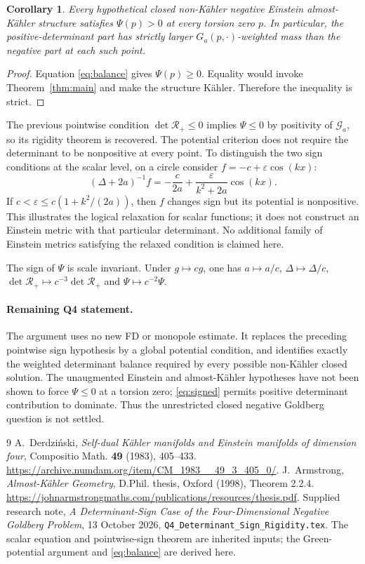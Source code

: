 \documentclass[11pt]{article}
\newtheorem{corollary}[theorem]{Corollary}
\theoremstyle{remark}\newtheorem{remark}[theorem]{Remark}
\newcommand{\RR}{\mathcal R_+}
\begin{document}
\begin{corollary}
Every hypothetical closed non-K\"ahler negative Einstein almost-K\"ahler
structure satisfies $\Psi(p)>0$ at every torsion zero $p$.
In particular, the positive-determinant part has strictly larger
$G_a(p,\cdot)$-weighted mass than the negative part at each such point.
\end{corollary}
\begin{proof}
Equation \eqref{eq:balance} gives $\Psi(p)\ge0$.
Equality would invoke Theorem~\ref{thm:main} and make the structure
K\"ahler. Therefore the inequality is strict.
\end{proof}

The previous pointwise condition $\det\RR\le0$ implies $\Psi\le0$
by positivity of $\mathcal G_a$, so its rigidity theorem is recovered.
The potential criterion does not require the determinant to be
nonpositive at every point. To distinguish the two sign conditions
at the scalar level, on a circle consider $f=-c+\varepsilon\cos(kx)$:
\[
 (\Delta+2a)^{-1}f=-\frac c{2a}
                       +\frac{\varepsilon}{k^2+2a}\cos(kx).
\]
If $c<\varepsilon\le c(1+k^2/(2a))$, then $f$ changes sign but its
potential is nonpositive. This illustrates the logical relaxation for
scalar functions; it does not construct an Einstein metric with that
particular determinant. No additional family of Einstein metrics
satisfying the relaxed condition is claimed here.

The sign of $\Psi$ is scale invariant. Under $g\mapsto cg$, one has
$a\mapsto a/c$, $\Delta\mapsto\Delta/c$, $\det\RR\mapsto c^{-3}\det\RR$
and $\Psi\mapsto c^{-2}\Psi$.

\paragraph{Remaining Q4 statement.}
The argument uses no new FD or monopole estimate. It replaces the preceding
pointwise sign hypothesis by a global potential condition, and identifies
exactly the weighted determinant balance required by every possible
non-K\"ahler closed solution. The unaugmented Einstein and almost-K\"ahler
hypotheses have not been shown to force $\Psi\le0$ at a torsion zero;
\eqref{eq:signed} permits positive determinant contribution to dominate.
Thus the unrestricted closed negative Goldberg question is not settled.

\begin{thebibliography}{9}
A.~Derdzi\'nski,
\emph{Self-dual K\"ahler manifolds and Einstein manifolds of dimension four},
Compositio Math. \textbf{49} (1983), 405--433.
\url{https://archive.numdam.org/item/CM_1983__49_3_405_0/}.
J.~Armstrong, \emph{Almost-K\"ahler Geometry}, D.Phil. thesis, Oxford (1998),
Theorem 2.2.4.
\url{https://johnarmstrongmaths.com/publications/resources/thesis.pdf}.
Supplied research note, \emph{A Determinant-Sign Case of the Four-Dimensional
Negative Goldberg Problem}, 13 October 2026,
\texttt{Q4\_Determinant\_Sign\_Rigidity.tex}.
The scalar equation and pointwise-sign theorem are inherited inputs;
the Green-potential argument and \eqref{eq:balance} are derived here.
\end{thebibliography}
\end{document}
